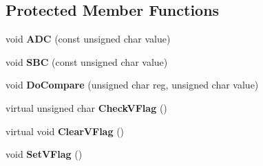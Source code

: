 \subsection*{Protected Member Functions}
\begin{DoxyCompactItemize}
\item 
\mbox{\label{class_c_p_u_aed1fb0898dc4fb96a0fb06fbf43031cc}} 
void {\bfseries A\+DC} (const unsigned char value)
\item 
\mbox{\label{class_c_p_u_ab929f143c61d68677927e24d8d69b215}} 
void {\bfseries S\+BC} (const unsigned char value)
\item 
\mbox{\label{class_c_p_u_aa06e9114ce1837d44e86a76b1c99679f}} 
void {\bfseries Do\+Compare} (unsigned char reg, unsigned char value)
\item 
\mbox{\label{class_c_p_u_aa739dba0e9cf2f22ac3f36452cdfa086}} 
virtual unsigned char {\bfseries Check\+V\+Flag} ()
\item 
\mbox{\label{class_c_p_u_a895846d3f1132f579f498373372e0c57}} 
virtual void {\bfseries Clear\+V\+Flag} ()
\item 
\mbox{\label{class_c_p_u_af4247ff4347e71b51bad1d90affdfc6a}} 
void {\bfseries Set\+V\+Flag} ()
\end{DoxyCompactItemize}
